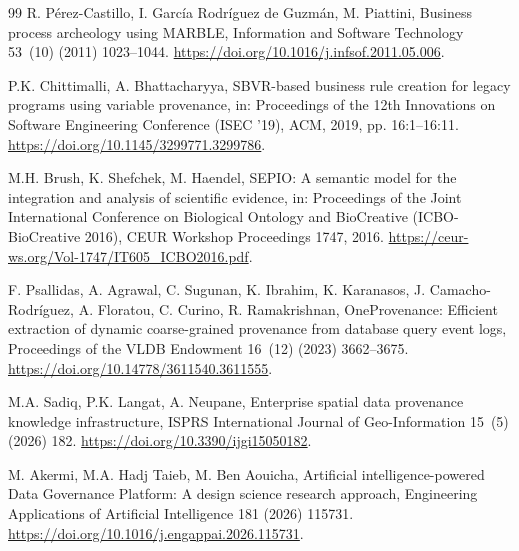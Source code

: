 \documentclass[a4paper,fleqn]{cas-dc}
\begin{document}
\begin{thebibliography}{99}
R. P\'erez-Castillo, I. Garc\'ia Rodr\'iguez de Guzm\'an, M. Piattini,
\newblock Business process archeology using MARBLE,
\newblock Information and Software Technology 53~(10) (2011) 1023--1044.
\newblock \url{https://doi.org/10.1016/j.infsof.2011.05.006}.

P.K. Chittimalli, A. Bhattacharyya,
\newblock SBVR-based business rule creation for legacy programs using variable provenance,
\newblock in: Proceedings of the 12th Innovations on Software Engineering Conference (ISEC '19), ACM, 2019, pp. 16:1--16:11.
\newblock \url{https://doi.org/10.1145/3299771.3299786}.

M.H. Brush, K. Shefchek, M. Haendel,
\newblock SEPIO: A semantic model for the integration and analysis of scientific evidence,
\newblock in: Proceedings of the Joint International Conference on Biological Ontology and BioCreative (ICBO-BioCreative 2016), CEUR Workshop Proceedings 1747, 2016.
\newblock \url{https://ceur-ws.org/Vol-1747/IT605_ICBO2016.pdf}.

F. Psallidas, A. Agrawal, C. Sugunan, K. Ibrahim, K. Karanasos, J. Camacho-Rodr\'iguez, A. Floratou, C. Curino, R. Ramakrishnan,
\newblock OneProvenance: Efficient extraction of dynamic coarse-grained provenance from database query event logs,
\newblock Proceedings of the VLDB Endowment 16~(12) (2023) 3662--3675.
\newblock \url{https://doi.org/10.14778/3611540.3611555}.

M.A. Sadiq, P.K. Langat, A. Neupane,
\newblock Enterprise spatial data provenance knowledge infrastructure,
\newblock ISPRS International Journal of Geo-Information 15~(5) (2026) 182.
\newblock \url{https://doi.org/10.3390/ijgi15050182}.

M. Akermi, M.A. Hadj Taieb, M. Ben Aouicha,
\newblock Artificial intelligence-powered Data Governance Platform: A design science research approach,
\newblock Engineering Applications of Artificial Intelligence 181 (2026) 115731.
\newblock \url{https://doi.org/10.1016/j.engappai.2026.115731}.

\end{thebibliography}
\end{document}
